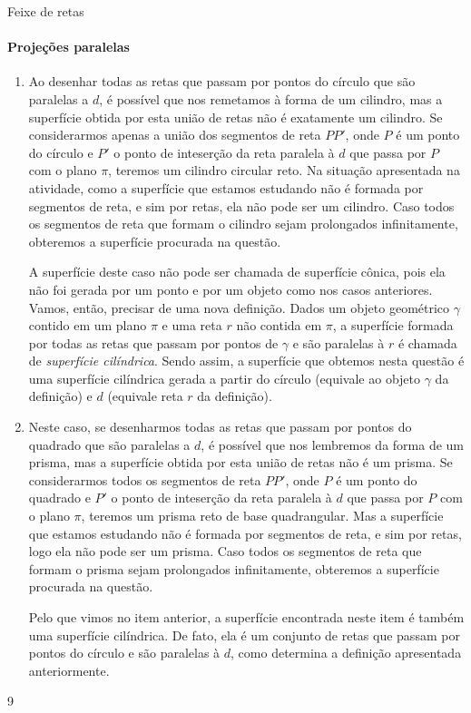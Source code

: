 \begin{answer}{Feixe de retas}
{
\paragraph{Projeções paralelas}
\begin{enumerate}
\item Ao desenhar todas as retas que passam por pontos do círculo que são paralelas a \(d\), é possível que nos remetamos à forma de um cilindro, mas a superfície obtida por esta união de retas não é exatamente um cilindro. Se considerarmos apenas a união dos segmentos de reta \(PP'\), onde \(P\) é um ponto do círculo e \(P'\) o ponto de inteserção da reta paralela à \(d\) que passa por \(P\) com o plano \(\pi\), teremos um cilindro circular reto. Na situação apresentada na atividade, como a superfície que estamos estudando não é formada por segmentos de reta, e sim por retas, ela não pode ser um cilindro. Caso todos os segmentos de reta que formam o cilindro sejam prolongados infinitamente, obteremos a superfície procurada na questão.

A superfície deste caso não pode ser chamada de superfície cônica, pois ela não foi gerada por um ponto e por um objeto como nos casos anteriores. Vamos, então, precisar de uma nova definição. Dados um objeto geométrico \(\gamma\) contido em um plano \(\pi\) e uma reta \(r\) não contida em \(\pi\), a superfície formada por todas as retas que passam por pontos de \(\gamma\) e são paralelas à \(r\) é chamada de \textit{superfície cilíndrica}. Sendo assim, a superfície que obtemos nesta questão é uma superfície cilíndrica gerada a partir do círculo (equivale ao objeto \(\gamma\) da definição) e \(d\) (equivale reta \(r\) da definição).

\item {} 
Neste caso, se desenharmos todas as retas que passam por pontos do quadrado que são paralelas a \(d\), é possível que nos lembremos da forma de um prisma, mas a superfície obtida por esta união de retas não é um prisma. Se considerarmos todos os segmentos de reta \(PP'\), onde \(P\) é um ponto do quadrado e \(P'\) o ponto de inteserção da reta paralela à \(d\) que passa por \(P\) com o plano \(\pi\), teremos um prisma reto de base quadrangular. Mas a superfície que estamos estudando não é formada por segmentos de reta, e sim por retas, logo ela não pode ser um prisma. Caso todos os segmentos de reta que formam o prisma sejam prolongados infinitamente, obteremos a superfície procurada na questão.

Pelo que vimos no item anterior, a superfície encontrada neste item é também uma superfície cilíndrica. De fato, ela é um conjunto de retas que passam por pontos do círculo e são paralelas à \(d\), como determina a definição apresentada anteriormente.
\end{enumerate}
}{9}
\end{answer}
